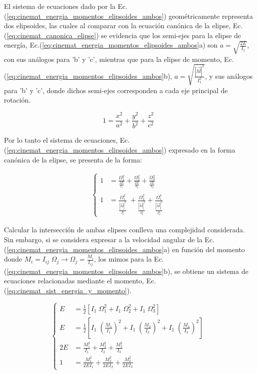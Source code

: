 \documentclass[oneside,a4paper,english,links]{amca}
\begin{document}
El sistema de ecuaciones dado por la Ec.(\ref{eq:cinemat_energia_momentos_elipsoides_ambos}) geom\'etricamente representa dos elipsoides, las cuales al comparar con la ecuaci\'on can\'onica de la elipse, Ec.(\ref{eq:cinemat_canonica_elipse}) se evidencia que los semi-ejes para la elipse de energ\'ia, Ec.(\ref{eq:cinemat_energia_momentos_elipsoides_ambos}a) son $a=\sqrt{\frac{2E}{I_1}}$, con sus an\'alogos para 'b' y 'c', mientras que para la elipse de momento, Ec.(\ref{eq:cinemat_energia_momentos_elipsoides_ambos}b),  $a=\sqrt{\frac{|\vec{M}|^2}{I_1^2}}$, y sus an\'alogos para 'b' y 'c', donde dichos semi-ejes corresponden a cada eje principal de rotaci\'on.

\begin{equation}
     1=\frac{x^2}{a^2}+\frac{y^2}{b^2}+\frac{z^2}{c^2}
     \label{eq:cinemat_canonica_elipse} 
\end{equation}


Por lo tanto el sistema de ecuaciones, Ec.(\ref{eq:cinemat_energia_momentos_elipsoides_ambos}) expresado en la forma can\'onica de la elipse, se presenta de la forma:

\begin{equation}
\begin{split}
     \begin{cases}
     1&=\frac{\Omega_1^2}{\frac{2E}{I_1}}+\frac{\Omega_2^2}{\frac{2E}{I_2}}+\frac{\Omega_3^2}{\frac{2E}{I_3}}\\
     \\
     1&=\frac{\Omega_1^2}{\frac{|\vec{M}|^2}{I_1^2}}\;+\frac{\Omega_2^2}{\frac{|\vec{M}|^2}{I_2^2}}+\frac{\Omega_1^3 }{\frac{|\vec{M}|^2}{I_3^2}} 
     \end{cases}
     \end{split}
     \label{eq:cinemat_energia_momentos_elipsoides_ambos_expresados_en_forma_canocia}
\end{equation}

Calcular la intersecci\'on de ambas elipses conlleva una complejidad considerada. Sin embargo, si se considera expresar a la velocidad angular de la Ec.(\ref{eq:cinemat_energia_momentos_elipsoides_ambos}a)  en funci\'on del momento donde ${M}_i={I}_{ij}\;
\Omega_j \xrightarrow{} \Omega_j=\frac{{M_i}}{I_{ij}}$, los mimos para la Ec.(\ref{eq:cinemat_energia_momentos_elipsoides_ambos}b), se obtiene un sistema de ecuaciones relacionadas mediante el momento, Ec.(\ref{eq:cinemat_sist_energia_y_momento}).

\begin{equation}
\begin{cases}
    E&=\frac{1}{2}\left[I_1\;\Omega_1^2+I_1\;\Omega_2^2+I_1\;\Omega_3^2  \right]\\
    E&=\frac{1}{2}\left[I_1\;\left(\frac{M_1}{I_1}\right)^2+I_1\;\left(\frac{M_2}{I_2}\right)^2+I_1\;\left(\frac{M_3}{I_3}\right)^2  \right]\\    
    2E&=\frac{M_1^2}{I_1}+\frac{M_2^2}{I_2}+\frac{M_3^2}{I_3}\\
    1&=\frac{M_1^2}{2EI_1}+\frac{M_2^2}{2EI_2}+\frac{M_3^2}{2EI_3}
    \end{cases}
    \label{eq:cinemat_energia_segun_momento}
\end{equation}
\end{document}
